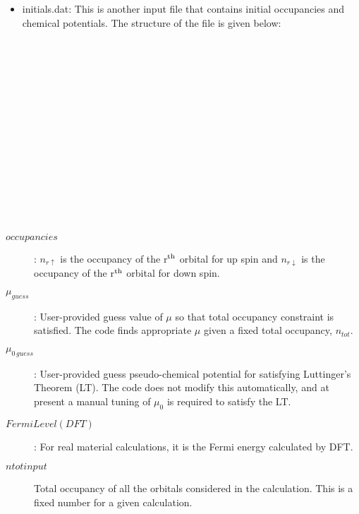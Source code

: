 \documentclass[a4paper]{article}
\begin{document}
\begin{itemize}
\item initials.dat: This is another input file that contains initial occupancies and
chemical potentials. The structure of the file is given below:\\
\\
\\
\\
\\
\\
\\
\\
\\
\\
\\
\\
\\
\\
\\
\end{itemize}

\begin{description}
\item [$occupancies$]: $n_{r\uparrow}$ is the occupancy of the r$^{\rm th}$  orbital for up spin and $n_{r\downarrow}$ is the occupancy of the r$^{\rm th}$ orbital for down spin.
\item [$\mu_{guess}$]: User-provided guess value of $\mu$ so that total occupancy constraint is satisfied. The code finds appropriate $\mu$ given a fixed total occupancy, $n_{tot}$.
\item [$\mu_{0\, guess}$]: User-provided guess pseudo-chemical potential for satisfying 
Luttinger's Theorem (LT). The code does not modify this automatically, and at present a manual
tuning of $\mu_0$ is required to satisfy the LT.
\item [$Fermi Level (DFT)$]: For real material calculations, it is the Fermi energy calculated by DFT.
\item [$ntotinput$] Total occupancy of all the orbitals considered in the calculation.
This is a fixed number for a given calculation.
\end{description}
\end{document}

